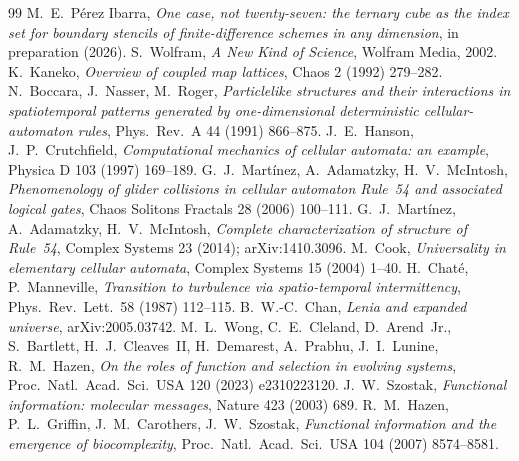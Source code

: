 \documentclass[11pt,a4paper]{article}
\theoremstyle{definition}
\theoremstyle{remark}
\begin{document}
\begin{thebibliography}{99}
M.~E.~P\'erez Ibarra,
\emph{One case, not twenty-seven: the ternary cube as the index set for
boundary stencils of finite-difference schemes in any dimension},
in preparation (2026).
S.~Wolfram, \emph{A New Kind of Science}, Wolfram Media, 2002.
K.~Kaneko, \emph{Overview of coupled map lattices}, Chaos 2 (1992) 279--282.
N.~Boccara, J.~Nasser, M.~Roger, \emph{Particlelike structures and their
interactions in spatiotemporal patterns generated by one-dimensional
deterministic cellular-automaton rules}, Phys.\ Rev.\ A 44 (1991)
866--875.
J.~E.~Hanson, J.~P.~Crutchfield, \emph{Computational mechanics of
cellular automata: an example}, Physica D 103 (1997) 169--189.
G.~J.~Mart\'inez, A.~Adamatzky, H.~V.~McIntosh, \emph{Phenomenology of
glider collisions in cellular automaton Rule~54 and associated logical
gates}, Chaos Solitons Fractals 28 (2006) 100--111.
G.~J.~Mart\'inez, A.~Adamatzky, H.~V.~McIntosh, \emph{Complete
characterization of structure of Rule~54}, Complex Systems 23 (2014);
arXiv:1410.3096.
M.~Cook, \emph{Universality in elementary cellular automata}, Complex
Systems 15 (2004) 1--40.
H.~Chat\'e, P.~Manneville, \emph{Transition to turbulence via
spatio-temporal intermittency}, Phys.\ Rev.\ Lett.\ 58 (1987) 112--115.
B.~W.-C.~Chan, \emph{Lenia and expanded universe}, arXiv:2005.03742.
M.~L.~Wong, C.~E.~Cleland, D.~Arend~Jr., S.~Bartlett, H.~J.~Cleaves~II,
H.~Demarest, A.~Prabhu, J.~I.~Lunine, R.~M.~Hazen, \emph{On the roles of
function and selection in evolving systems}, Proc.\ Natl.\ Acad.\ Sci.\
USA 120 (2023) e2310223120.
J.~W.~Szostak, \emph{Functional information: molecular messages}, Nature
423 (2003) 689.
R.~M.~Hazen, P.~L.~Griffin, J.~M.~Carothers, J.~W.~Szostak,
\emph{Functional information and the emergence of biocomplexity},
Proc.\ Natl.\ Acad.\ Sci.\ USA 104 (2007) 8574--8581.
\end{thebibliography}
\end{document}
